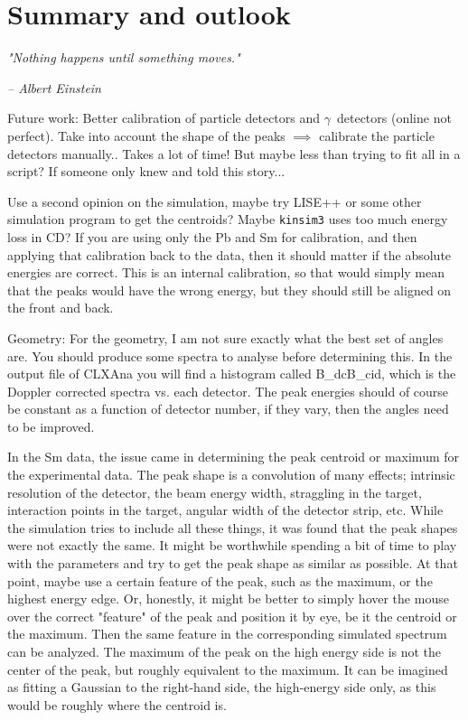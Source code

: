 \documentclass[twoside,english]{uiofysmaster/uiofysmaster}
\newcommand{\ga}{$\gamma$}
\begin{document}

\chapter{Summary and outlook}
\epigraph{\textit{"Nothing happens until something moves."}}{\textit{– Albert Einstein}}


Future work: Better calibration of particle detectors and \ga\ detectors (online not perfect). Take into account the shape of the peaks $\implies$ calibrate the particle detectors manually.. Takes a lot of time! But maybe less than trying to fit all in a script? If someone only knew and told this story...

Use a second opinion on the simulation, maybe try LISE++ or some other simulation program to get the centroids?
Maybe \texttt{kinsim3} uses too much energy loss in CD? 
If you are using only the Pb and Sm for calibration, and then applying that calibration back to the data, then it should matter if the absolute energies are correct. 
This is an internal calibration, so that would simply mean that the peaks would have the wrong energy, but they should still be aligned on the front and back.


\bigskip

Geometry:
For the geometry, I am not sure exactly what the best set of angles are. You should produce some spectra to analyse before determining this. In the output file of CLXAna you will find a histogram called B\_dcB\_cid, which is the Doppler corrected spectra vs. each detector. The peak energies should of course be constant as a function of detector number, if they vary, then the angles need to be improved.


\bigskip


In the Sm data, the issue came in determining the peak centroid or maximum for the experimental data. 
The peak shape is a convolution of many effects; intrinsic resolution of the detector, the beam energy width, straggling in the target, interaction points in the target, angular width of the detector strip, etc. 
While the simulation tries to include all these things, it was found that the peak shapes were not exactly the same. 
It might be worthwhile spending a bit of time to play with the parameters and try to get the peak shape as similar as possible. 
At that point, maybe use a certain feature of the peak, such as the maximum, or the highest energy edge. 
Or, honestly, it might be better to simply hover the mouse over the correct "feature" of the peak and position it by eye, be it the centroid or the maximum.
Then the same feature in the corresponding simulated spectrum can be analyzed.
The maximum of the peak on the high energy side is not the center of the peak, but roughly equivalent to the maximum. 
It can be imagined as fitting a Gaussian to the right-hand side, the high-energy side only, as this would be roughly where the centroid is. 
\end{document}
